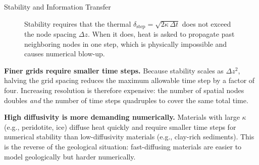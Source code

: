 \begin{activity}{Stability and Information Transfer}
\begin{figure}[h]
\centering
{}
\caption{Stability requires that the thermal  $\delta_{\text{step}} = \sqrt{2 \kappa\,\Delta t}$ does not exceed the node spacing $\Delta z$. When it does, heat is asked to propagate past neighboring nodes in one step, which is physically impossible and causes numerical blow-up.}
\end{figure}

\textbf{Finer grids require smaller time steps.} Because stability scales as $\Delta z^2$, halving the grid spacing reduces the maximum allowable time step by a factor of four. Increasing resolution is therefore expensive: the number of spatial nodes doubles \emph{and} the number of time steps quadruples to cover the same total time.

\textbf{High diffusivity is more demanding numerically.} Materials with large $\kappa$ (e.g., peridotite, ice) diffuse heat quickly and require smaller time steps for numerical stability than low-diffusivity materials (e.g., clay-rich sediments). This is the reverse of the geological situation: fast-diffusing materials are easier to model geologically but harder numerically.

\end{activity}
